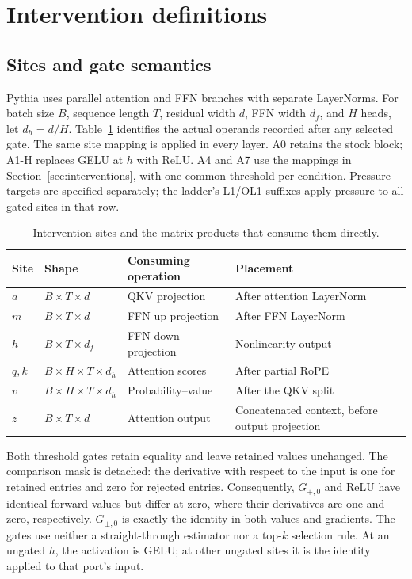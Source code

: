 \section{Intervention definitions}
\label{app:interventions}

\subsection{Sites and gate semantics}

Pythia uses parallel attention and FFN branches with separate LayerNorms.
For batch size $B$, sequence length $T$, residual width $d$, FFN width $d_f$,
and $H$ heads, let $d_h=d/H$. Table~\ref{tab:sites} identifies the actual
operands recorded after any selected gate. The same site mapping is applied
in every layer. A0 retains the stock block; A1-H replaces GELU at $h$ with
ReLU. A4 and A7 use the mappings in Section~\ref{sec:interventions}, with one
common threshold per condition. Pressure targets are specified separately;
the ladder's L1/OL1 suffixes apply pressure to all gated sites in that row.

\begin{table}[ht]
\centering\small
\begin{tabularx}{\linewidth}{@{}lllX@{}}
\toprule
Site & Shape & Consuming operation & Placement \\
\midrule
$a$ & $B\!\times\!T\!\times\!d$ & QKV projection & After attention LayerNorm \\
$m$ & $B\!\times\!T\!\times\!d$ & FFN up projection & After FFN LayerNorm \\
$h$ & $B\!\times\!T\!\times\!d_f$ & FFN down projection & Nonlinearity output \\
$q,k$ & $B\!\times\!H\!\times\!T\!\times\!d_h$ & Attention scores & After partial RoPE \\
$v$ & $B\!\times\!H\!\times\!T\!\times\!d_h$ & Probability--value & After the QKV split \\
$z$ & $B\!\times\!T\!\times\!d$ & Attention output & Concatenated context, before output projection \\
\bottomrule
\end{tabularx}
\caption{Intervention sites and the matrix products that consume them directly.}
\label{tab:sites}
\end{table}

Both threshold gates retain equality and leave retained values unchanged.
The comparison mask is detached: the derivative with respect to the input
is one for retained entries and zero for rejected entries. Consequently,
$G_{+,0}$ and ReLU have identical forward values but differ at zero, where
their derivatives are one and zero, respectively. $G_{\pm,0}$ is exactly the
identity in both values and gradients. The gates use neither a straight-through
estimator nor a top-$k$ selection rule. At an ungated $h$, the activation is
GELU; at other ungated sites it is the identity applied to that port's input.

